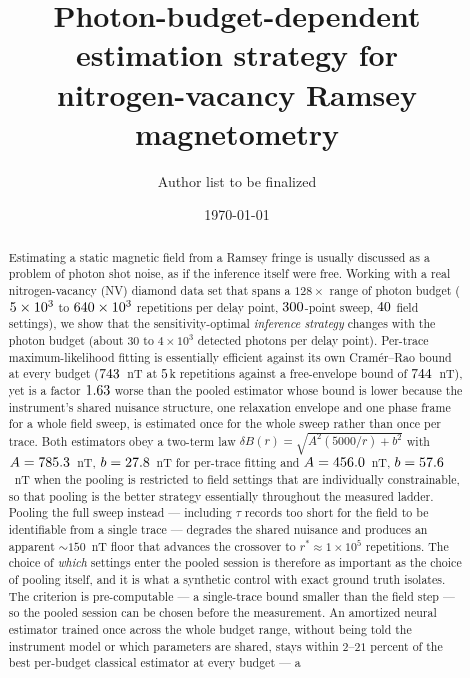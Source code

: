 \documentclass[aps,pra,twocolumn,superscriptaddress,nofootinbib]{revtex4-2}
\newcommand{\dB}{\delta B}
\begin{document}
\title{Photon-budget-dependent estimation strategy for\\
nitrogen-vacancy Ramsey magnetometry}

\author{Author list to be finalized}
\affiliation{}

\date{\today}

\begin{abstract}
Estimating a static magnetic field from a Ramsey fringe is usually discussed as a problem
of photon shot noise, as if the inference itself were free. Working with a real
nitrogen-vacancy (NV) diamond data set that spans a $128\times$ range of photon budget
($5\times10^{3}$ to $640\times10^{3}$ repetitions per delay point, $300$-point
sweep, $40$ field settings), we show that the sensitivity-optimal \emph{inference
strategy} changes with the photon budget (about $30$ to $4\times10^{3}$ detected photons per
delay point). Per-trace maximum-likelihood fitting is essentially
efficient against its own Cram\'er--Rao bound at every budget ($743$~nT at
$5$k repetitions against a free-envelope bound of $744$~nT), yet is a
factor $1.63$ worse than the pooled estimator whose bound is lower because the
instrument's shared nuisance structure, one relaxation envelope and one phase frame for a
whole field sweep, is estimated once for the whole sweep rather than once per trace. Both estimators obey a two-term law
$\dB(r)=\sqrt{A^{2}(5000/r)+b^{2}}$ with $A=785.3$~nT, $b=27.8$~nT for per-trace
fitting and $A=456.0$~nT, $b=57.6$~nT when the pooling is restricted to field
settings that are individually constrainable, so that pooling is the better strategy
essentially throughout the measured ladder. Pooling the full sweep instead --- including
$\tau$ records too short for the field to be identifiable from a single trace --- degrades
the shared nuisance and produces an apparent $\sim\!150$~nT floor that advances the
crossover to $r^{*}\approx1\times10^{5}$ repetitions. The choice of \emph{which} settings
enter the pooled session is therefore as important as the choice of pooling itself, and it
is what a synthetic control with exact ground truth isolates. The criterion is pre-computable --- a
single-trace bound smaller than the field step --- so the pooled session can be chosen
before the measurement. An amortized neural estimator trained once across the whole budget
range, without being told the instrument model or which parameters are shared, stays within
$2$--$21$ percent of the best per-budget classical estimator at every budget --- a

\end{abstract}
\end{document}
